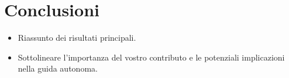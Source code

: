 \documentclass[conference]{IEEEtran}
\begin{document}
\section{Conclusioni}

\begin{itemize}
    \item Riassunto dei risultati principali.

    \item Sottolineare l'importanza del vostro contributo e le potenziali implicazioni nella guida autonoma.

\end{itemize}



\end{document}
